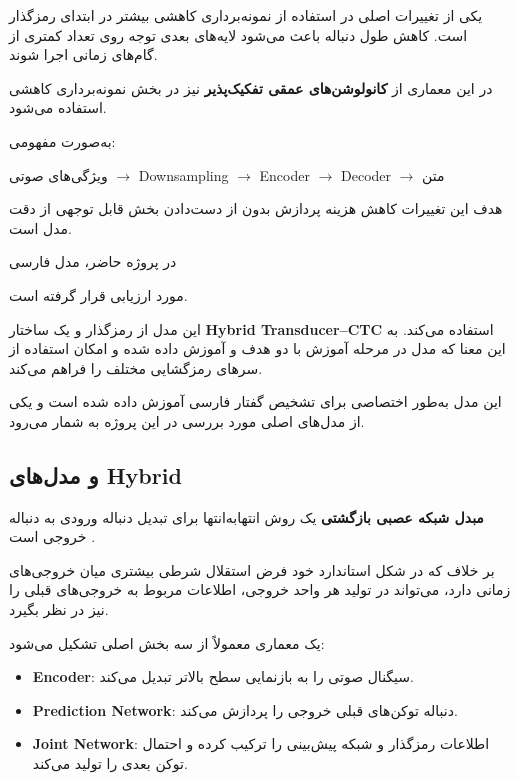 یکی از تغییرات اصلی در  استفاده از
نمونه‌برداری کاهشی بیشتر در ابتدای رمزگذار است.
کاهش طول دنباله باعث می‌شود لایه‌های بعدی توجه روی تعداد
کمتری از گام‌های زمانی اجرا شوند.

در این معماری از
\textbf{کانولوشن‌های عمقی تفکیک‌پذیر}
نیز در بخش نمونه‌برداری کاهشی استفاده می‌شود.

به‌صورت مفهومی:

\begin{center}
ویژگی‌های صوتی
$\longrightarrow$
Downsampling
$\longrightarrow$
 Encoder
$\longrightarrow$
Decoder
$\longrightarrow$
متن
\end{center}

هدف این تغییرات کاهش هزینه پردازش بدون از دست‌دادن بخش قابل
توجهی از دقت مدل است.

در پروژه حاضر، مدل فارسی

\begin{center}
\end{center}

مورد ارزیابی قرار گرفته است.

این مدل از رمزگذار  و یک ساختار
\textbf{Hybrid Transducer--CTC}
استفاده می‌کند.
به این معنا که مدل در مرحله آموزش با دو هدف
 و 
آموزش داده شده و امکان استفاده از سرهای رمزگشایی مختلف را
فراهم می‌کند.

این مدل به‌طور اختصاصی برای تشخیص گفتار فارسی آموزش داده شده
است و یکی از مدل‌های اصلی مورد بررسی در این پروژه به شمار
می‌رود.


\subsection{ و مدل‌های Hybrid}

\textbf{مبدل شبکه عصبی بازگشتی}
یک روش انتهابه‌انتها برای تبدیل دنباله ورودی به دنباله خروجی
است \cite{graves2012rnnt}.

بر خلاف  که در شکل استاندارد خود فرض استقلال
شرطی بیشتری میان خروجی‌های زمانی دارد،  می‌تواند
در تولید هر واحد خروجی، اطلاعات مربوط به خروجی‌های قبلی را
نیز در نظر بگیرد.

یک معماری  معمولاً از سه بخش اصلی تشکیل می‌شود:

\begin{itemize}

    \item
    \textbf{Encoder}:
    سیگنال صوتی را به بازنمایی سطح بالاتر تبدیل می‌کند.

    \item
    \textbf{Prediction Network}:
    دنباله توکن‌های قبلی خروجی را پردازش می‌کند.

    \item
    \textbf{Joint Network}:
    اطلاعات رمزگذار و شبکه پیش‌بینی را ترکیب کرده و احتمال
    توکن بعدی را تولید می‌کند.

\end{itemize}

